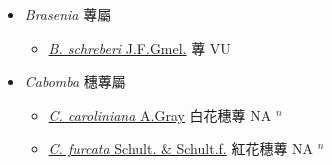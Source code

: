 
  \begin{itemize}
 \item[] \textit{Brasenia} 蓴屬
                    
  \begin{itemize}
        \item[] \href{http://www.theplantlist.org/tpl1.1/search?q=Brasenia+schreberi}{\textit{B. schreberi} J.F.Gmel.}   蓴 VU
  \end{itemize}
 \item[] \textit{Cabomba} 穗蓴屬
                    
  \begin{itemize}
        \item[] \href{http://www.theplantlist.org/tpl1.1/search?q=Cabomba+caroliniana}{\textit{C. caroliniana} A.Gray}   白花穗蓴 NA $^n$
        \item[] \href{http://www.theplantlist.org/tpl1.1/search?q=Cabomba+furcata}{\textit{C. furcata} Schult. \& Schult.f.}   紅花穗蓴 NA $^n$
  \end{itemize}
  \end{itemize}
